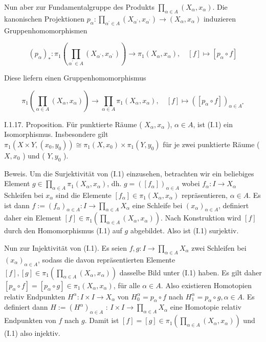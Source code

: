 \documentclass[10pt]{article}
\begin{document}
Nun aber zur Fundamentalgruppe des Produkts $\prod_{\alpha \in A}\left(X_{\alpha}, x_{\alpha}\right)$. Die kanonischen Projektionen $p_{\alpha}: \prod_{\alpha^{\prime} \in A}\left(X_{\alpha^{\prime}}, x_{\alpha^{\prime}}\right) \rightarrow\left(X_{\alpha}, x_{\alpha}\right)$ induzieren Gruppenhomomorphismen

$$
\left(p_{\alpha}\right)_{*}: \pi_{1}\left(\prod_{\alpha^{\prime} \in A}\left(X_{\alpha^{\prime}}, x_{\alpha^{\prime}}\right)\right) \rightarrow \pi_{1}\left(X_{\alpha}, x_{\alpha}\right), \quad[f] \mapsto\left[p_{\alpha} \circ f\right]
$$

Diese liefern einen Gruppenhomomorphismus

$$
\pi_{1}\left(\prod_{\alpha \in A}\left(X_{\alpha}, x_{\alpha}\right)\right) \rightarrow \prod_{\alpha \in A} \pi_{1}\left(X_{\alpha}, x_{\alpha}\right), \quad[f] \mapsto\left(\left[p_{\alpha} \circ f\right]\right)_{\alpha \in A^{*}}
$$

I.1.17. Proposition. Für punktierte Räume ( $X_{\alpha}, x_{\alpha}$ ), $\alpha \in A$, ist (I.1) ein Isomorphismus. Insbesondere gilt $\pi_{1}\left(X \times Y,\left(x_{0}, y_{0}\right)\right) \cong \pi_{1}\left(X, x_{0}\right) \times \pi_{1}\left(Y, y_{0}\right)$ für je zwei punktierte Räume ( $X, x_{0}$ ) und ( $Y, y_{0}$ ).

Beweis. Um die Surjektivität von (I.1) einzusehen, betrachten wir ein beliebiges Element $g \in \prod_{\alpha \in A} \pi_{1}\left(X_{\alpha}, x_{\alpha}\right)$, dh. $g=\left(\left[f_{\alpha}\right]\right)_{\alpha \in A}$ wobei $f_{\alpha}: I \rightarrow X_{\alpha}$ Schleifen bei $x_{\alpha}$ sind die Elemente $\left[f_{\alpha}\right] \in \pi_{1}\left(X_{\alpha}, x_{\alpha}\right)$ repräsentieren, $\alpha \in A$. Es ist dann $f:=\left(f_{\alpha}\right)_{\alpha \in A}: I \rightarrow \prod_{\alpha \in A} X_{\alpha}$ eine Schleife bei $\left(x_{\alpha}\right)_{\alpha \in A}$, definiert daher ein Element $[f] \in \pi_{1}\left(\prod_{\alpha \in A}\left(X_{\alpha}, x_{\alpha}\right)\right)$. Nach Konstruktion wird $[f]$ durch den Homomorphismus (I.1) auf $g$ abgebildet. Also ist (I.1) surjektiv.

Nun zur Injektivität von (I.1). Es seien $f, g: I \rightarrow \prod_{\alpha \in A} X_{\alpha}$ zwei Schleifen bei $\left(x_{\alpha}\right)_{\alpha \in A}$, sodass die davon repräsentierten Elemente $[f],[g] \in \pi_{1}\left(\prod_{\alpha \in A}\left(X_{\alpha}, x_{\alpha}\right)\right)$ dasselbe Bild unter (I.1) haben. Es gilt daher $\left[p_{\alpha} \circ f\right]=\left[p_{\alpha} \circ g\right] \in \pi_{1}\left(X_{\alpha}, x_{\alpha}\right)$, für alle $\alpha \in A$. Also existieren Homotopien relativ Endpunkten $H^{\alpha}: I \times I \rightarrow X_{\alpha}$ von $H_{0}^{\alpha}=p_{\alpha} \circ f$ nach $H_{1}^{\alpha}=p_{\alpha} \circ g, \alpha \in A$. Es definiert dann $H:=\left(H^{\alpha}\right)_{\alpha \in A}$ : $I \times I \rightarrow \prod_{\alpha \in A} X_{\alpha}$ eine Homotopie relativ Endpunkten von $f$ nach $g$. Damit ist $[f]=[g] \in \pi_{1}\left(\prod_{\alpha \in A}\left(X_{\alpha}, x_{\alpha}\right)\right)$ und (I.1) also injektiv.
\end{document}

